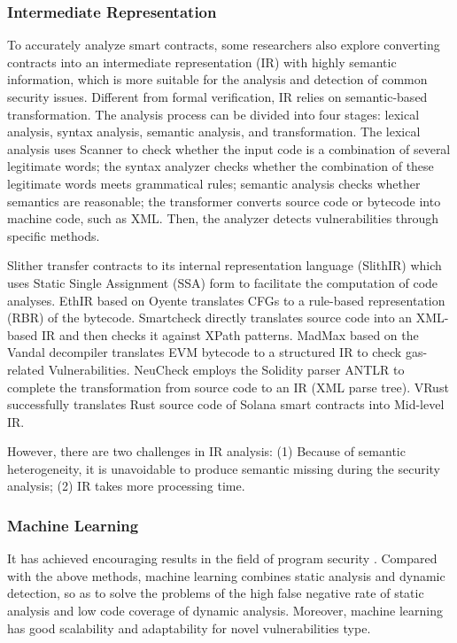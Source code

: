 \documentclass[manuscript,screen]{acmart}
\begin{document}
\subsubsection{Intermediate Representation}
To accurately analyze smart contracts, some researchers also explore converting contracts into an intermediate representation (IR) with highly semantic information, which is more suitable for the analysis and detection of common security issues. Different from formal verification, IR relies on semantic-based transformation. The analysis process can be divided into four stages: lexical analysis, syntax analysis, semantic analysis, and transformation.
The lexical analysis uses Scanner to check whether the input code is a combination of several legitimate words; the syntax analyzer checks whether the combination of these legitimate words meets grammatical rules; semantic analysis checks whether semantics are reasonable; the transformer converts source code or bytecode into machine code, such as XML. Then, the analyzer detects vulnerabilities through specific methods. 

Slither \cite{FeistGG19} transfer contracts to its internal representation language (SlithIR) which uses Static Single Assignment (SSA) form to facilitate the computation of code analyses. 
EthIR \cite{AlbertGLRS18} based on Oyente translates CFGs to a rule-based representation (RBR) of the bytecode.
Smartcheck \cite{TikhomirovVITMA18} directly translates source code into an XML-based IR and then checks it against XPath patterns.  
MadMax \cite{GrechKJBSS18} based on the Vandal \cite{abs-1809-03981} decompiler translates EVM bytecode to a structured IR to check gas-related Vulnerabilities.
NeuCheck \cite{LuWZSE21} employs the Solidity parser ANTLR to complete the transformation from source code to an IR (XML parse tree). VRust \cite{CuiZGT022} successfully translates Rust source code of Solana smart contracts into Mid-level IR.


However, there are two challenges in IR analysis: (1) Because of semantic heterogeneity, it is unavoidable to produce semantic missing during the security analysis; (2) IR takes more processing time.


\subsubsection{Machine Learning}
It has achieved encouraging results in the field of program security \cite{ZhengGWLXLC20, ChakrabortyKDR22, hanif2021rise}. Compared with the above methods, machine learning combines static analysis and dynamic detection, so as to solve the problems of the high false negative rate of static analysis and low code coverage of dynamic analysis. Moreover, machine learning has good scalability and adaptability for novel vulnerabilities type.
\end{document}
